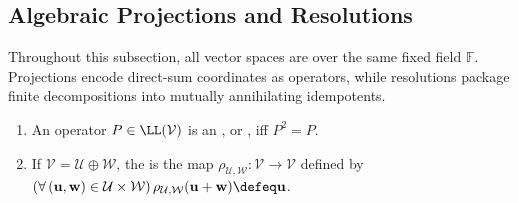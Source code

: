 \subsection{Algebraic Projections and Resolutions}
Throughout this subsection, all vector spaces are over the same fixed field $\mathbb{F}$. Projections encode direct-sum coordinates as operators, while resolutions package finite decompositions into mutually annihilating idempotents.

\begin{definition} \label{def:projection-onto-subspace-along-complement} 
\begin{enumerate}[label=(\roman*)]
\setlength{\itemsep}{0pt}
\item An operator $P\in\LL(\mathcal{V})$ is an , or , iff $P^2=P$.
\item If $\mathcal{V}=\mathcal{U}\oplus\mathcal{W}$, the  is the map $\rho_{\mathcal{U},\mathcal{W}}:\mathcal{V}\to\mathcal{V}$ defined by $(\forall\,(\mathbf{u},\mathbf{w})\in\mathcal{U}\times\mathcal{W})\,\rho_{\mathcal{U},\mathcal{W}}(\mathbf{u}+\mathbf{w})\defeq\mathbf{u}$.
\end{enumerate}
\end{definition}

